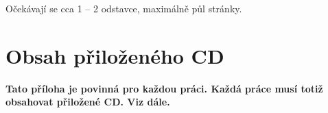 \documentclass[11pt,twoside,a4paper]{book}
\begin{document}
	\noindent
	Očekávají se cca 1 -- 2 odstavce, maximálně půl stránky.

	\tableofcontents		%

	\listoffigures			%
	\listoftables			%

	\mainbodystarts




%
%


%




%
{
\def\CS{$\cal C\kern-0.1667em\lower.5ex\hbox{$\cal S$}\kern-0.075em $}

}

%


\appendix	

\printnomenclature
\label{apx:zkratky}

\chapter{Obsah přiloženého CD}
\textbf{\large Tato příloha je povinná pro každou práci. Každá práce musí totiž obsahovat přiložené CD. Viz dále.}
\end{document}
